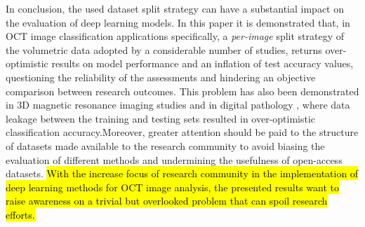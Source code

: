 \documentclass[fleqn,10pt]{wlscirep}
\begin{document}
In conclusion, the used dataset split strategy can have a substantial impact on the evaluation of deep learning models. In this paper it is demonstrated that, in OCT image classification applications specifically, a \textit{per-image} split strategy of the volumetric data adopted by a considerable number of studies, returns over-optimistic results on model performance and an inflation of test accuracy values, questioning the reliability of the assessments and hindering an objective comparison between research outcomes.  This problem has also been demonstrated in 3D magnetic resonance imaging studies \cite{yagis2021effect} and in digital pathology \cite{bussola2021ai}, where data leakage between the training and testing sets resulted in over-optimistic classification accuracy.Moreover, greater attention should be paid to the structure of datasets made available to the research community to avoid biasing the evaluation of different methods and undermining the usefulness of open-access datasets.  \hl{With the increase focus of research community in the implementation of deep learning methods for OCT image analysis, the presented results want to raise awareness on a trivial but overlooked problem that can spoil research efforts.}
\end{document}
